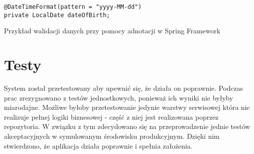 \begin{listing}[H]
    \begin{verbatim}
@DateTimeFormat(pattern = "yyyy-MM-dd")
private LocalDate dateOfBirth;
\end{verbatim}
    \caption{Przykład walidacji danych przy pomocy adnotacji w Spring Framework}
    \label{lst:validation}
\end{listing}

\section{Testy}

System został przetestowany aby upewnić się, że działa on poprawnie. Podczas prac zrezygnowano z testów jednostkowych, ponieważ ich wyniki nie byłyby miarodajne. Możliwe byłoby przetestowanie jedynie warstwy serwisowej która nie realizuje pełnej logiki biznesowej - część z niej jest realizowana poprzez repozytoria. W związku z tym zdecydowano się na przeprowadzenie jednie testów akceptacyjnych w symulowanym środowisku produkcyjnym. Dzięki nim stwierdzono, że aplikacja działa poprawnie i spełnia założenia.